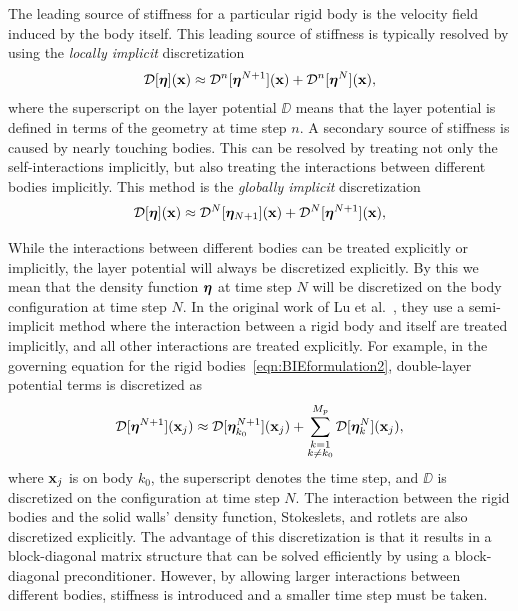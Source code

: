 \documentclass[preprint, 10pt]{elsarticle}
\begin{document}
The leading source of stiffness for a particular rigid body
is the velocity field induced by the body itself. This leading source of
stiffness is typically resolved by using the {\em locally implicit}
discretization
\begin{align*}
  {\mathcal{D}}[{\boldsymbol\eta}]({\mathbf{x}}) \approx {\mathcal{D}}^{n}[{\boldsymbol\eta}^{N+1}]({\mathbf{x}}) +
  {\mathcal{D}}^{n}[{\boldsymbol\eta}^N]({\mathbf{x}}),
\end{align*}
where the superscript on the layer potential $\DD$ means that the layer
potential is defined in terms of the geometry at time step $n$.  A
secondary source of stiffness is caused by nearly touching bodies.  This
can be resolved by treating not only the self-interactions  implicitly,
but also treating the interactions between different bodies implicitly.
This method is the {\em globally implicit} discretization
\begin{align*}
  {\mathcal{D}}[{\boldsymbol\eta}]({\mathbf{x}}) \approx {\mathcal{D}}^{N}[{\boldsymbol\eta}_{N+1}]({\mathbf{x}}) +
  {\mathcal{D}}^{N}[{\boldsymbol\eta}^{N+1}]({\mathbf{x}}),
\end{align*}



While the interactions between
different bodies can be treated explicitly or implicitly, the layer
potential will always be discretized explicitly. By this we mean that
the density function ${\boldsymbol\eta}$ at time step $N$ will be discretized on the
body configuration at time step $N$.  In the original work of Lu et
al.~\cite{Lu2017}, they use a semi-implicit method where the interaction
between a rigid body and itself are treated implicitly, and all other
interactions are treated explicitly.  For example, in the governing
equation for the rigid bodies~\eqref{eqn:BIEformulation2}, double-layer
potential terms is discretized as
\begin{align}
 {\mathcal{D}}[{\boldsymbol\eta}^{N+1}]({\mathbf{x}}_j) \approx
  {\mathcal{D}}[{\boldsymbol\eta}^{N+1}_{k_0}]({\mathbf{x}}_j) + 
  \sum_{\substack{k=1 \\ k \neq k_0}}^{M_p} {\mathcal{D}}[{\boldsymbol\eta}^{N}_k]({\mathbf{x}}_j),
  \label{eqn:BlockImplicit}
\end{align}
where ${\mathbf{x}}_j$ is on body $k_0$, the superscript denotes the time
step, and $\DD$ is discretized on the configuration at time step $N$. The interaction between the
rigid bodies and the solid walls'
density function, Stokeslets, and rotlets are also discretized
explicitly.  The advantage of this discretization is that it results in
a block-diagonal matrix structure that can be solved efficiently by using a block-diagonal
preconditioner. However, by allowing
larger interactions between different bodies, stiffness is introduced
and a smaller time step must be taken. 
\end{document}
